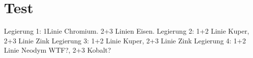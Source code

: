 \section{Test}\label{sec:versuch}






Legierung 1: 1Linie Chromium. 2+3 Linien Eisen.
Legierung 2: 1+2 Linie Kuper, 2+3 Linie Zink
Legierung 3: 1+2 Linie Kuper, 2+3 Linie Zink
Legierung 4: 1+2 Linie Neodym WTF?, 2+3 Kobalt?